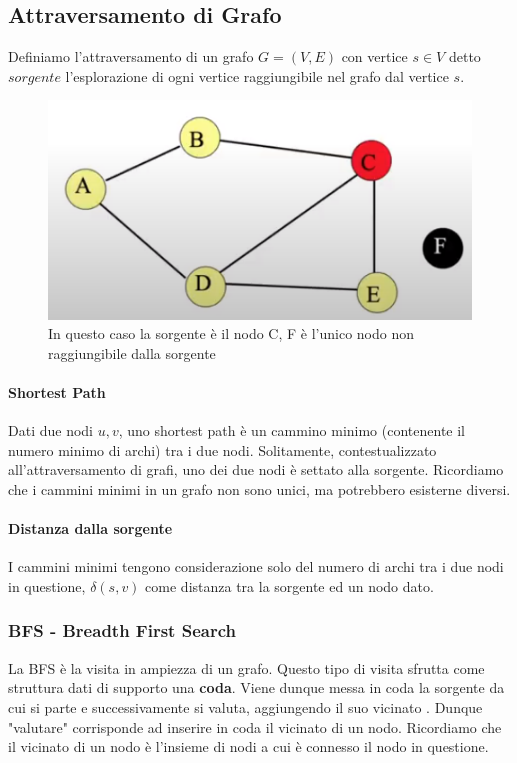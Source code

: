 \documentclass{article}
\begin{document}
\newpage



\subsection{Attraversamento di Grafo}

Definiamo l'attraversamento di un grafo $G = (V,E)$ con vertice $s \in V$ detto $sorgente$ l'esplorazione di ogni vertice raggiungibile nel grafo dal vertice $s$.

\begin{figure}[htbp]
        \center
        \includegraphics[scale=0.55]{img/attraversamentoGrafo.png}
        \caption{In questo caso la sorgente è il nodo C, F è l'unico nodo non raggiungibile dalla sorgente}
\end{figure}

\paragraph{Shortest Path} Dati due nodi $u,v$, uno shortest path è un cammino minimo (contenente il numero minimo di archi) tra i due nodi. Solitamente, contestualizzato all'attraversamento di grafi, uno dei due nodi è settato alla sorgente. Ricordiamo che i cammini minimi in un grafo non sono unici, ma potrebbero esisterne diversi. 

\paragraph{Distanza dalla sorgente} I cammini minimi tengono considerazione solo del numero di archi tra i due nodi in questione, $\delta(s,v)$ come distanza tra la sorgente ed un nodo dato.

\subsubsection{BFS - Breadth First Search} La BFS è la visita in ampiezza di un grafo. Questo tipo di visita sfrutta come struttura dati di supporto una \textbf{coda}. Viene dunque messa in coda la sorgente da cui si parte e successivamente si valuta, aggiungendo il suo vicinato . Dunque "valutare" corrisponde ad inserire in coda il vicinato di un nodo. Ricordiamo che il vicinato di un nodo è l'insieme di nodi a cui è connesso il nodo in questione.
\end{document}
